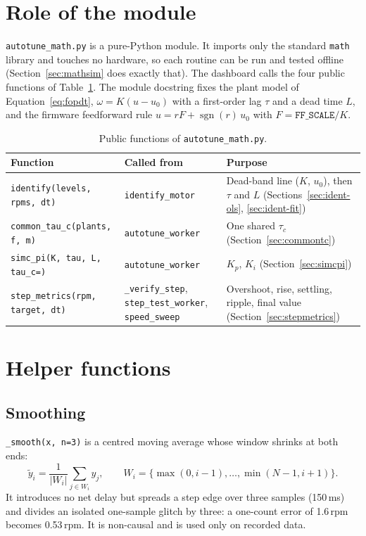 \documentclass[11pt,a4paper]{report}
\newcommand{\code}[1]{\texttt{#1}}
\begin{document}
\section{Role of the module}
\code{autotune\_math.py} is a pure-Python module. It imports only the standard \code{math} library and touches no hardware, so each routine can be run and tested offline (Section~\ref{sec:mathsim} does exactly that). The dashboard calls the four public functions of Table~\ref{tab:mathfun}. The module docstring fixes the plant model of Equation~\eqref{eq:fopdt}, $\omega = K(u-u_0)$ with a first-order lag $\tau$ and a dead time $L$, and the firmware feedforward rule $u = rF + \operatorname{sgn}(r)\,u_0$ with $F=\texttt{FF\_SCALE}/K$.

\begin{table}[H]
\centering
\caption{Public functions of \code{autotune\_math.py}.}\label{tab:mathfun}
\small
\begin{tabular}{@{}p{4.6cm}p{4.2cm}p{5.2cm}@{}}
\toprule
Function & Called from & Purpose\\
\midrule
\code{identify(levels, rpms, dt)} & \code{identify\_motor} & Dead-band line ($K$, $u_0$), then $\tau$ and $L$ (Sections~\ref{sec:ident-ols}, \ref{sec:ident-fit})\\
\code{common\_tau\_c(plants, f, m)} & \code{autotune\_worker} & One shared $\tau_c$ (Section~\ref{sec:commontc})\\
\code{simc\_pi(K, tau, L, tau\_c=)} & \code{autotune\_worker} & $K_p$, $K_i$ (Section~\ref{sec:simcpi})\\
\code{step\_metrics(rpm, target, dt)} & \code{\_verify\_step}, \code{step\_test\_worker}, \code{speed\_sweep} & Overshoot, rise, settling, ripple, final value (Section~\ref{sec:stepmetrics})\\
\bottomrule
\end{tabular}
\end{table}

\section{Helper functions}
\subsection*{Smoothing}
\code{\_smooth(x, n=3)} is a centred moving average whose window shrinks at both ends:
\begin{equation}
  \tilde y_i=\frac{1}{|W_i|}\sum_{j\in W_i}y_j,\qquad W_i=\{\max(0,i-1),\dots,\min(N-1,i+1)\}.
\end{equation}
It introduces no net delay but spreads a step edge over three samples (150\,ms) and divides an isolated one-sample glitch by three: a one-count error of 1.6\,rpm becomes 0.53\,rpm. It is non-causal and is used only on recorded data.
\end{document}
